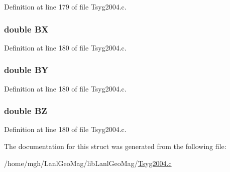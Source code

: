Definition at line 179 of file Tsyg2004.c.\hypertarget{struct___t_s04_info_0b9b0532b448223253b5d5fefc28ddef}{
\subsubsection[{BX}]{\setlength{\rightskip}{0pt plus 5cm}double {\bf BX}}}
\label{struct___t_s04_info_0b9b0532b448223253b5d5fefc28ddef}




Definition at line 180 of file Tsyg2004.c.\hypertarget{struct___t_s04_info_c2f197c29d02f4b0e2b15cbaaf5d8438}{
\subsubsection[{BY}]{\setlength{\rightskip}{0pt plus 5cm}double {\bf BY}}}
\label{struct___t_s04_info_c2f197c29d02f4b0e2b15cbaaf5d8438}




Definition at line 180 of file Tsyg2004.c.\hypertarget{struct___t_s04_info_361205dbe12b66613d8b2b0036a775f3}{
\subsubsection[{BZ}]{\setlength{\rightskip}{0pt plus 5cm}double {\bf BZ}}}
\label{struct___t_s04_info_361205dbe12b66613d8b2b0036a775f3}




Definition at line 180 of file Tsyg2004.c.

The documentation for this struct was generated from the following file:\begin{CompactItemize}
\item 
/home/mgh/LanlGeoMag/libLanlGeoMag/\hyperlink{_tsyg2004_8c}{Tsyg2004.c}\end{CompactItemize}
